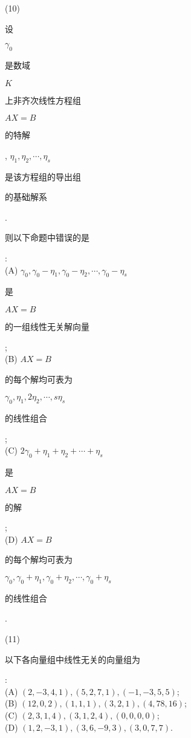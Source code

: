 \documentclass[10pt]{article}
\begin{document}
(10) \begin{CJK}{UTF8}{mj}设\end{CJK} $\gamma_{0}$ \begin{CJK}{UTF8}{mj}是数域\end{CJK} $K$ \begin{CJK}{UTF8}{mj}上非齐次线性方程组\end{CJK} $A X=B$ \begin{CJK}{UTF8}{mj}的特解\end{CJK}, $\eta_{1}, \eta_{2}, \cdots, \eta_{s}$ \begin{CJK}{UTF8}{mj}是该方程组的导出组\end{CJK} \begin{CJK}{UTF8}{mj}的基础解系\end{CJK}. \begin{CJK}{UTF8}{mj}则以下命题中错误的是\end{CJK}:\\
(A) $\gamma_{0}, \gamma_{0}-\eta_{1}, \gamma_{0}-\eta_{2}, \cdots, \gamma_{0}-\eta_{s}$ \begin{CJK}{UTF8}{mj}是\end{CJK} $A X=B$ \begin{CJK}{UTF8}{mj}的一组线性无关解向量\end{CJK};\\
(B) $A X=B$ \begin{CJK}{UTF8}{mj}的每个解均可表为\end{CJK} $\gamma_{0}, \eta_{1}, 2 \eta_{2}, \cdots, s \eta_{s}$ \begin{CJK}{UTF8}{mj}的线性组合\end{CJK};\\
(C) $2 \gamma_{0}+\eta_{1}+\eta_{2}+\cdots+\eta_{s}$ \begin{CJK}{UTF8}{mj}是\end{CJK} $A X=B$ \begin{CJK}{UTF8}{mj}的解\end{CJK};\\
(D) $A X=B$ \begin{CJK}{UTF8}{mj}的每个解均可表为\end{CJK} $\gamma_{0}, \gamma_{0}+\eta_{1}, \gamma_{0}+\eta_{2}, \cdots, \gamma_{0}+\eta_{s}$ \begin{CJK}{UTF8}{mj}的线性组合\end{CJK}.

(11)\begin{CJK}{UTF8}{mj}以下各向量组中线性无关的向量组为\end{CJK}:\\
(A) $(2,-3,4,1),(5,2,7,1),(-1,-3,5,5)$;\\
(B) $(12,0,2),(1,1,1),(3,2,1),(4,78,16)$;\\
(C) $(2,3,1,4),(3,1,2,4),(0,0,0,0)$;\\
(D) $(1,2,-3,1),(3,6,-9,3),(3,0,7,7)$.
\end{document}
